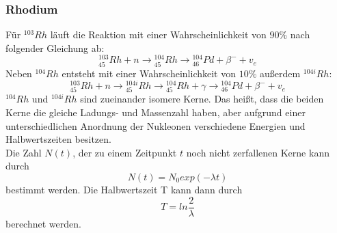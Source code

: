 \subsubsection*{Rhodium}
Für ${^{103}Rh}$ läuft die Reaktion mit einer Wahrscheinlichkeit von $90 \% $ nach folgender Gleichung ab:
\begin{equation}
    \label{eqn:r}
    {^{103}_{45}Rh} + n \rightarrow {^{104}_{45}Rh} \rightarrow {^{104}_{46}Pd} + \beta^- +v_e
\end{equation}
\newline
Neben ${^{104}Rh}$ entsteht mit einer Wahrscheinlichkeit von $10 \%$ außerdem ${^{104i}Rh}$: 
\begin{equation}
    \label{eqn:ri}
    {^{103}_{45}Rh} + n \rightarrow {^{104i}_{45}Rh}\rightarrow {^{104}_{45}Rh} + \gamma \rightarrow {^{104}_{46}Pd} + \beta^- +v_e
\end{equation}
${^{104}Rh}$ und ${^{104i}Rh}$ sind zueinander isomere Kerne. Das heißt, dass die beiden Kerne die gleiche Ladungs- und Massenzahl haben, aber aufgrund einer unterschiedlichen Anordnung der Nukleonen verschiedene Energien und Halbwertszeiten besitzen.
\newline
\\
Die Zahl $N(t)$, der zu einem Zeitpunkt $t$ noch nicht zerfallenen Kerne kann durch
\begin{equation}
    N(t) = N_0 exp(− \lambda t)
\end{equation}
bestimmt werden.
Die Halbwertszeit T kann dann durch
\begin{equation}
T = ln \frac{2}{\lambda}
\end{equation}
berechnet werden.

